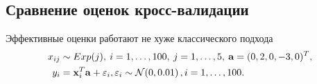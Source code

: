\documentclass[unicode,lefteqn,c,hyperref={pdfpagelabels=false}]{beamer}
\begin{document}
\subsection{Сравнение оценок кросс-валидации}
\begin{frame}{Эффективные оценки работают не хуже классического подхода}
	\vspace{-20pt}
	\begin{align*}
		x_{ij} &\sim Exp(j), \: i=1,\ldots,100, \: j=1,\ldots,5, \: \boldsymbol{\mathbf{a}} = (0, 2, 0, -3, 0)^T, \\
		y_{i} &= \boldsymbol{\mathbf{x}}_i^T \boldsymbol{\mathbf{a}} + {\varepsilon}_i, {\varepsilon}_i \sim \mathcal{N}\!\left(0,0{.}01\right), i=1,\ldots,100. 
	\end{align*}
	\vspace{-15pt}
	\begin{columns}
		\hspace{-15pt}
	\end{columns}
\end{frame}
\end{document}
